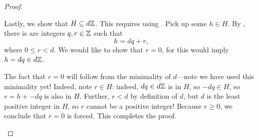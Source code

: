 \documentclass[../main.tex]{subfiles}
\begin{document}
\begin{proof}
\begin{listalph}
        Lastly, we show that $H\subseteq d\mathbb Z$. This requires using . Pick up some $h\in H$. By , there is are integers $q,r\in\mathbb Z$ such that
        \[h=dq+r,\]
        where $0\le r<d$. We would like to show that $r=0$, for this would imply $h=dq\in d\mathbb Z$.
        
        The fact that $r=0$ will follow from the minimality of $d$---note we have used this minimality yet! Indeed, note $r\in H$: indeed, $dq\in d\mathbb Z$ is in $H$, so $-dq\in H$, so $r=h+-dq$ is also in $H$. Further, $r<d$ by definition of $d$, but $d$ is the least positive integer in $H$, so $r$ cannot be a positive integer! Because $r\ge0$, we conclude that $r=0$ is forced. This completes the proof.
        \qedhere
    \end{listalph}
\end{proof}






\end{document}
